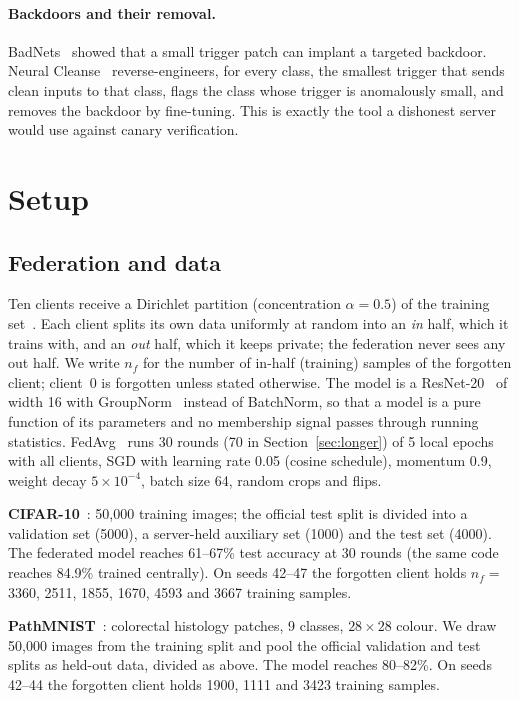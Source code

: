 \documentclass[11pt]{article}
\begin{document}
\paragraph{Backdoors and their removal.} BadNets~\cite{gu2017} showed that a
small trigger patch can implant a targeted backdoor. Neural
Cleanse~\cite{wang2019} reverse-engineers, for every class, the smallest
trigger that sends clean inputs to that class, flags the class whose trigger is
anomalously small, and removes the backdoor by fine-tuning. This is exactly the
tool a dishonest server would use against canary verification.

\section{Setup}

\subsection{Federation and data}

Ten clients receive a Dirichlet partition (concentration $\alpha=0.5$) of the
training set~\cite{hsu2019}. Each client splits its own data uniformly at
random into an \emph{in} half, which it trains with, and an \emph{out} half,
which it keeps private; the federation never sees any out half. We write
$n_f$ for the number of in-half (training) samples of the forgotten client;
client~0 is forgotten unless stated otherwise. The model is a ResNet-20~\cite{he2016}
of width 16 with GroupNorm~\cite{wu2018} instead of BatchNorm, so that a model
is a pure function of its parameters and no membership signal passes through
running statistics. FedAvg~\cite{mcmahan2017} runs 30 rounds (70 in
Section~\ref{sec:longer}) of 5 local epochs with all clients, SGD with learning
rate 0.05 (cosine schedule), momentum 0.9, weight decay $5\times10^{-4}$, batch
size 64, random crops and flips.

\textbf{CIFAR-10}~\cite{krizhevsky2009}: 50{,}000 training images; the official
test split is divided into a validation set (5000), a server-held auxiliary set
(1000) and the test set (4000). The federated model reaches 61--67\% test
accuracy at 30 rounds (the same code reaches 84.9\% trained centrally). On
seeds 42--47 the forgotten client holds $n_f =$ 3360, 2511, 1855, 1670, 4593 and
3667 training samples.

\textbf{PathMNIST}~\cite{yang2023medmnist,kather2019}: colorectal histology
patches, 9 classes, $28\times28$ colour. We draw 50{,}000 images from the
training split and pool the official validation and test splits as held-out
data, divided as above. The model reaches 80--82\%. On seeds 42--44 the
forgotten client holds 1900, 1111 and 3423 training samples.
\end{document}
